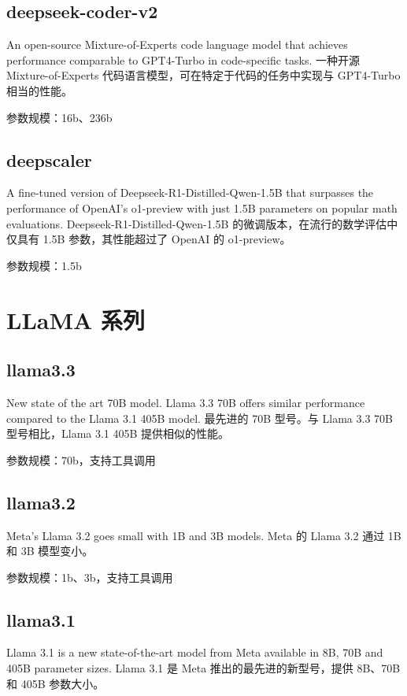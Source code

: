 \documentclass[12pt,UTF8]{ctexbook}
\begin{document}
\subsection{deepseek-coder-v2}

An open-source Mixture-of-Experts code language model that achieves performance comparable to GPT4-Turbo in code-specific tasks.
一种开源 Mixture-of-Experts 代码语言模型，可在特定于代码的任务中实现与 GPT4-Turbo 相当的性能。

参数规模：16b、236b

\subsection{deepscaler}

A fine-tuned version of Deepseek-R1-Distilled-Qwen-1.5B that surpasses the performance of OpenAI's o1-preview with just 1.5B parameters on popular math evaluations.
Deepseek-R1-Distilled-Qwen-1.5B 的微调版本，在流行的数学评估中仅具有 1.5B 参数，其性能超过了 OpenAI 的 o1-preview。

参数规模：1.5b

\section{LLaMA 系列}

\subsection{llama3.3}

New state of the art 70B model. Llama 3.3 70B offers similar performance compared to the Llama 3.1 405B model.
最先进的 70B 型号。与 Llama 3.3 70B 型号相比，Llama 3.1 405B 提供相似的性能。

参数规模：70b，支持工具调用

\subsection{llama3.2}

Meta's Llama 3.2 goes small with 1B and 3B models.
Meta 的 Llama 3.2 通过 1B 和 3B 模型变小。

参数规模：1b、3b，支持工具调用

\subsection{llama3.1}

Llama 3.1 is a new state-of-the-art model from Meta available in 8B, 70B and 405B parameter sizes.
Llama 3.1 是 Meta 推出的最先进的新型号，提供 8B、70B 和 405B 参数大小。
\end{document}
